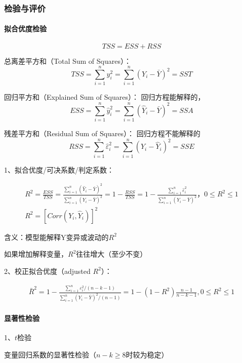 \documentclass[12pt]{book}
\begin{document}
\subsubsection{检验与评价}

\paragraph{拟合优度检验}

$$
TSS=ESS+RSS
$$

\par 总离差平方和（Total Sum of Squares）：  
$$ TSS=\sum_{i=1}^{n}y_i^2=\sum_{i=1}^{n}\left(Y_i-\bar{Y}\right)^2=SST $$  
\par 回归平方和（Explained Sum of Squares）： 回归方程能解释的，  
$$ ESS=\sum_{i=1}^{n}{\hat{y}}_i^2=\sum_{i=1}^{n}\left({\hat{Y}}_i-\bar{Y}\right)^2=SSA $$
\par 残差平方和（Residual Sum of Squares）： 回归方程不能解释的  
$$ RSS=\sum_{i=1}^{n}{\hat{\varepsilon}}_i^2=\sum_{i=1}^{n}\left(Y_i-{\hat{Y}}_i\right)^2=SSE $$


1、拟合优度/可决系数/判定系数：

\begin{gather*}
R^2=\frac{ESS}{TSS} 
=\frac{\sum_{i=1}^{n}\left({\hat{Y}}_i-\bar{Y}\right)^2}{\sum_{i=1}^{n}\left(Y_i-\bar{Y}\right)^2} 
=1-\frac{RSS}{TSS}
=1-\frac{\sum_{i=1}^{n}{\hat{\varepsilon}}_i^2}{\sum_{i=1}^{n}\left(Y_i-\bar{Y}\right)^2}，0≤R^2≤1 \\ 
R^2=\left[Corr\left(Y_i,{\hat{Y}}_i\right)\right]^2
\end{gather*}


\par 含义：模型能解释Y变异或波动的$R^2$  
\par 如果增加解释变量，$R^2$往往增大（至少不变）

2、校正拟合优度（adjusted $R^2$）：

\begin{gather*}
    {\bar{R}}^2 
=1-\frac{\sum_{i=1}^{n}{\varepsilon_i^2/(n-k-1)}}{\sum_{i=1}^{n}{(Y_i-\bar{Y})^2}/(n-1)} 
=1-(1-R^2)\frac{n-1}{n-k-1}, 0\leqslant R^2\leqslant 1
\end{gather*}


\paragraph{显著性检验}

1、$t$检验

变量回归系数的显著性检验（$n-k\geq 8$时较为稳定）
\end{document}
